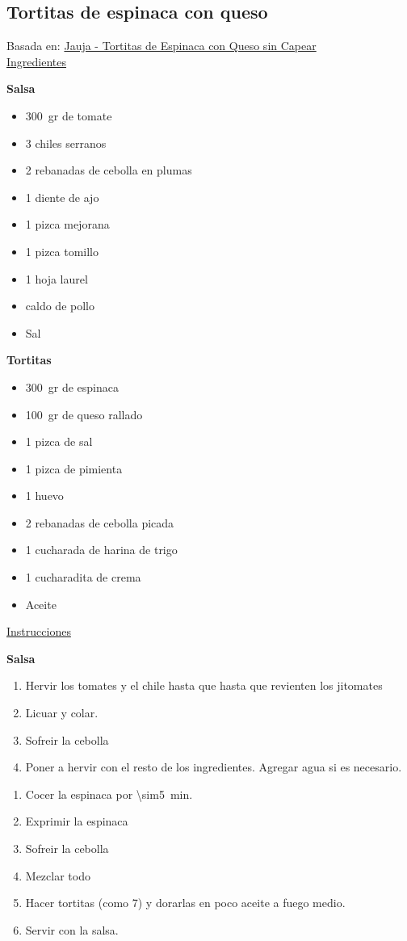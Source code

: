 \subsection{Tortitas de espinaca con queso}

Basada en: \href{https://www.youtube.com/watch?v=r7K9CjKKr6k}{Jauja - Tortitas de Espinaca con Queso sin Capear}\\

\underline{Ingredientes}

\textbf{Salsa}
\begin{itemize}
\item \SI{300}{gr} de tomate
\item 3 chiles serranos
\item 2 rebanadas de cebolla en plumas
\item 1 diente de ajo
\item 1 pizca mejorana
\item 1 pizca tomillo
\item 1 hoja laurel
\item caldo de pollo
\item Sal
\end{itemize}

\textbf{Tortitas}
\begin{itemize}
\item \SI{300}{gr} de espinaca
\item \SI{100}{gr} de queso rallado
\item 1 pizca de sal
\item 1 pizca de pimienta
\item 1 huevo
\item 2 rebanadas de cebolla picada
\item 1 cucharada de harina de trigo
\item 1 cucharadita de crema
\item Aceite
\end{itemize}

\underline{Instrucciones}

\textbf{Salsa}
\begin{enumerate}
\item Hervir los tomates y el chile hasta que hasta que revienten los jitomates
\item Licuar y colar.
\item Sofreir la cebolla
\item Poner a hervir con el resto de los ingredientes. Agregar agua si es necesario.
\end{enumerate}

\begin{enumerate}
\item Cocer la espinaca por \SI{\sim5}{min}.
\item Exprimir la espinaca
\item Sofreir la cebolla
\item Mezclar todo
\item Hacer tortitas (como 7) y dorarlas en poco aceite a fuego medio.
\item Servir con la salsa.
\end{enumerate}